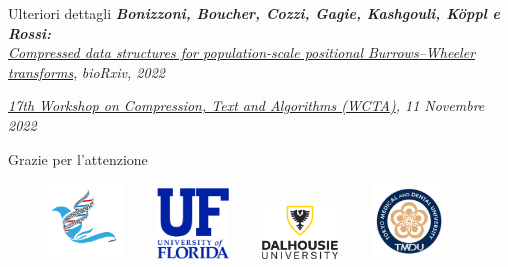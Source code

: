 \documentclass[]{beamer}
\begin{document}
\begin{frame}{}
  \begin{block}{Ulteriori dettagli}
    \footnotesize{\textit{\textbf{Bonizzoni, Boucher, Cozzi, Gagie, Kashgouli,
          K\"{o}ppl e Rossi:} \\\underline{Compressed data structures for
          population-scale positional Burrows--Wheeler transforms}},
      \textit{bioRxiv, 2022}} 
  \end{block}
  \begin{block}{}
    \footnotesize{\textit{\underline{17th Workshop on Compression, Text and
          Algorithms (WCTA)}, 11 Novembre 2022}}  
  \end{block}
  \begin{alertblock}{}
    \begin{center}
       {\LARGE{Grazie per l'attenzione}}
    \end{center}
  \end{alertblock}
  \vspace{-0.2cm}
  \begin{figure}[H]
    \centering
    \includegraphics[width = 0.18\textwidth]{img/bias_gh.png}$\quad\quad$
    \includegraphics[width = 0.17\textwidth]{img/ufl.png}$\quad\quad$
    \includegraphics[width = 0.18\textwidth]{img/dal.png}$\quad\quad$
    \includegraphics[width = 0.18\textwidth]{img/tmdu.jpg}
  \end{figure}
\end{frame}
\appendix
\begin{frame}[plain]{}
  
\end{frame}
\end{document}
